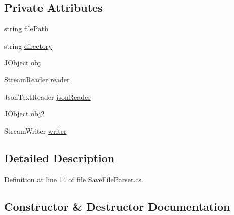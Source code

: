 \subsection*{Private Attributes}
\begin{DoxyCompactItemize}
\item 
string \hyperlink{class_c_p_u___o_s___simulator_1_1_save___file___editor_1_1_save_file_parser_a72ee7515830d28ee38f7948be3bc36f8}{file\+Path}
\item 
string \hyperlink{class_c_p_u___o_s___simulator_1_1_save___file___editor_1_1_save_file_parser_a4da217cd7a49f8a0b3ad09db5b609ab6}{directory}
\item 
J\+Object \hyperlink{class_c_p_u___o_s___simulator_1_1_save___file___editor_1_1_save_file_parser_a2538a13b548479f69ecfbfbbd7a6352d}{obj}
\item 
Stream\+Reader \hyperlink{class_c_p_u___o_s___simulator_1_1_save___file___editor_1_1_save_file_parser_afaaae9bacbb6b3e6bb60e6f2cf56b8fd}{reader}
\item 
Json\+Text\+Reader \hyperlink{class_c_p_u___o_s___simulator_1_1_save___file___editor_1_1_save_file_parser_a2bec0a18f532b3cfdd9aa3099f649f73}{json\+Reader}
\item 
J\+Object \hyperlink{class_c_p_u___o_s___simulator_1_1_save___file___editor_1_1_save_file_parser_af573707eb50c2153f2875df7978ef651}{obj2}
\item 
Stream\+Writer \hyperlink{class_c_p_u___o_s___simulator_1_1_save___file___editor_1_1_save_file_parser_ae55f5ab4843419903f5131ba85342bce}{writer}
\end{DoxyCompactItemize}


\subsection{Detailed Description}


Definition at line 14 of file Save\+File\+Parser.\+cs.



\subsection{Constructor \& Destructor Documentation}
\hypertarget{class_c_p_u___o_s___simulator_1_1_save___file___editor_1_1_save_file_parser_aba2cd09981d18cb3f274dd2cb3e7506e}{}
